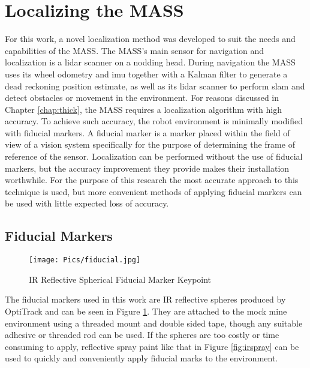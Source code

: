 \section{Localizing the MASS}

For this work, a novel localization method was developed to suit the needs and capabilities of the MASS. The MASS's main sensor for navigation and localization is a \acrshort{lidar} scanner on a nodding head. During navigation the MASS uses its wheel odometry and \acrshort{imu} together with a Kalman filter to generate a dead reckoning position estimate, as well as its \acrshort{lidar} scanner to perform \acrshort{slam} and detect obstacles or movement in the environment. For reasons discussed in Chapter \ref{chap:thick}, the MASS requires a localization algorithm with high accuracy. To achieve such accuracy, the robot environment is minimally modified with fiducial markers. A fiducial marker is a marker placed within the field of view of a vision system specifically for the purpose of determining the frame of reference of the sensor. Localization can be performed without the use of fiducial markers, but the accuracy improvement they provide makes their installation worthwhile. For the purpose of this research the most accurate approach to this technique is used, but more convenient methods of applying fiducial markers can be used with little expected loss of accuracy.\\

\subsection{Fiducial Markers}

\begin{figure}[h]
    \centering
    \texttt{[image: Pics/fiducial.jpg]}
    \caption{IR Reflective Spherical Fiducial Marker Keypoint}
    \label{fig:fiducial}
\end{figure}

The fiducial markers used in this work are IR reflective spheres produced by OptiTrack and can be seen in Figure \ref{fig:fiducial}. They are attached to the mock mine environment using a threaded mount and double sided tape, though any suitable adhesive or threaded rod can be used. If the spheres are too costly or time consuming to apply, reflective spray paint like that in Figure \ref{fig:irspray} can be used to quickly and conveniently apply fiducial marks to the environment.\\

